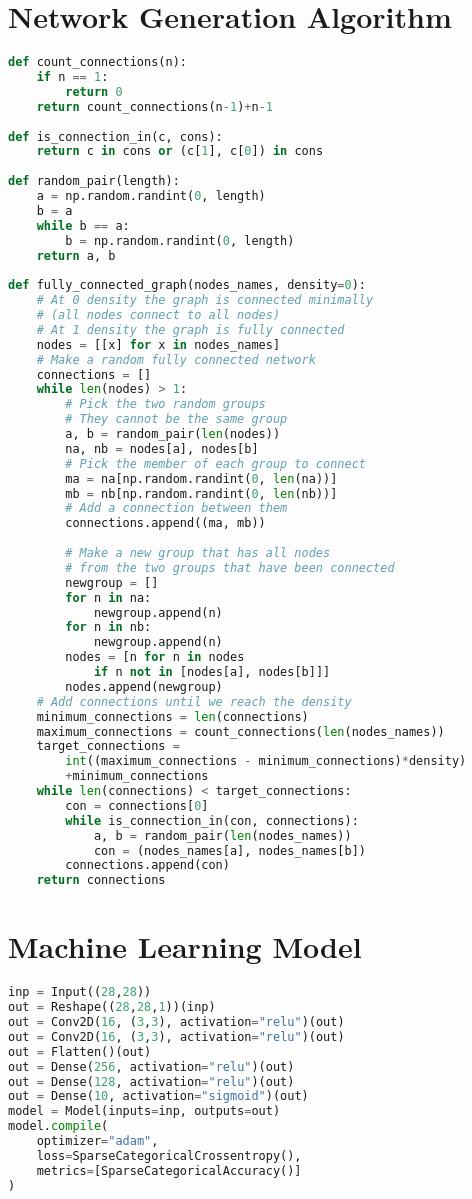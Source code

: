 \appendix
\chapter{Network Generation Algorithm}
\begin{lstlisting}[language=Python]
def count_connections(n):
	if n == 1:
		return 0
	return count_connections(n-1)+n-1
		
def is_connection_in(c, cons):
	return c in cons or (c[1], c[0]) in cons
	
def random_pair(length):
	a = np.random.randint(0, length)
	b = a
	while b == a:
		b = np.random.randint(0, length)
	return a, b
	
def fully_connected_graph(nodes_names, density=0):
	# At 0 density the graph is connected minimally
	# (all nodes connect to all nodes)
	# At 1 density the graph is fully connected
	nodes = [[x] for x in nodes_names]
	# Make a random fully connected network
	connections = []
	while len(nodes) > 1:
		# Pick the two random groups
		# They cannot be the same group
		a, b = random_pair(len(nodes))
		na, nb = nodes[a], nodes[b]
		# Pick the member of each group to connect
		ma = na[np.random.randint(0, len(na))]
		mb = nb[np.random.randint(0, len(nb))]
		# Add a connection between them
		connections.append((ma, mb))
		
		# Make a new group that has all nodes
		# from the two groups that have been connected
		newgroup = []
		for n in na:
			newgroup.append(n)
		for n in nb:
			newgroup.append(n)
		nodes = [n for n in nodes
			if n not in [nodes[a], nodes[b]]]
		nodes.append(newgroup)
	# Add connections until we reach the density
	minimum_connections = len(connections)
	maximum_connections = count_connections(len(nodes_names))
	target_connections = 
		int((maximum_connections - minimum_connections)*density)
		+minimum_connections
	while len(connections) < target_connections:
		con = connections[0]
		while is_connection_in(con, connections):
			a, b = random_pair(len(nodes_names))
			con = (nodes_names[a], nodes_names[b])
		connections.append(con)
	return connections
\end{lstlisting}


\chapter{Machine Learning Model} \label{ap:model}
\begin{lstlisting}[language=Python]
inp = Input((28,28))
out = Reshape((28,28,1))(inp)
out = Conv2D(16, (3,3), activation="relu")(out)
out = Conv2D(16, (3,3), activation="relu")(out)
out = Flatten()(out)
out = Dense(256, activation="relu")(out)
out = Dense(128, activation="relu")(out)
out = Dense(10, activation="sigmoid")(out)
model = Model(inputs=inp, outputs=out)
model.compile(
	optimizer="adam",
	loss=SparseCategoricalCrossentropy(),
	metrics=[SparseCategoricalAccuracy()]
)
\end{lstlisting}

